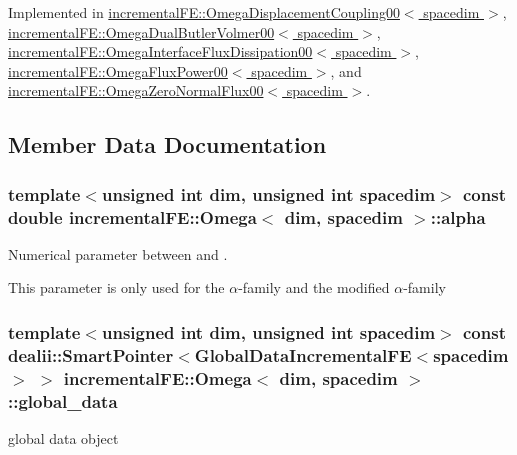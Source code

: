 Implemented in \hyperlink{classincremental_f_e_1_1_omega_displacement_coupling00_add2792deb962c321509264fce6fbdec5}{incremental\+F\+E\+::\+Omega\+Displacement\+Coupling00$<$ spacedim $>$}, \hyperlink{classincremental_f_e_1_1_omega_dual_butler_volmer00_ac3678f68c26fd880c2bd11fc357bc342}{incremental\+F\+E\+::\+Omega\+Dual\+Butler\+Volmer00$<$ spacedim $>$}, \hyperlink{classincremental_f_e_1_1_omega_interface_flux_dissipation00_a1d609a41db2f3231ad2f2d05aeea5441}{incremental\+F\+E\+::\+Omega\+Interface\+Flux\+Dissipation00$<$ spacedim $>$}, \hyperlink{classincremental_f_e_1_1_omega_flux_power00_abbcdc6c23167a34199401338b7fe058f}{incremental\+F\+E\+::\+Omega\+Flux\+Power00$<$ spacedim $>$}, and \hyperlink{classincremental_f_e_1_1_omega_zero_normal_flux00_a5e3158d47ccf7f0bf53dda6a93d27c57}{incremental\+F\+E\+::\+Omega\+Zero\+Normal\+Flux00$<$ spacedim $>$}.



\subsection{Member Data Documentation}
\subsubsection[{\texorpdfstring{alpha}{alpha}}]{\setlength{\rightskip}{0pt plus 5cm}template$<$unsigned int dim, unsigned int spacedim$>$ const double {\bf incremental\+F\+E\+::\+Omega}$<$ dim, spacedim $>$\+::alpha\hspace{0.3cm}{\ttfamily [private]}}\hypertarget{classincremental_f_e_1_1_omega_a891688560ec0ad8dc5a0058a7b400269}{}\label{classincremental_f_e_1_1_omega_a891688560ec0ad8dc5a0058a7b400269}
Numerical parameter between {} and {}.

This parameter is only used for the $\alpha$-\/family and the modified $\alpha$-\/family 
\subsubsection[{\texorpdfstring{global\+\_\+data}{global_data}}]{\setlength{\rightskip}{0pt plus 5cm}template$<$unsigned int dim, unsigned int spacedim$>$ const dealii\+::\+Smart\+Pointer$<${\bf Global\+Data\+Incremental\+FE}$<$spacedim$>$ $>$ {\bf incremental\+F\+E\+::\+Omega}$<$ dim, spacedim $>$\+::global\+\_\+data\hspace{0.3cm}{\ttfamily [private]}}\hypertarget{classincremental_f_e_1_1_omega_abd23d288a7a4a43f9b528be968cd2113}{}\label{classincremental_f_e_1_1_omega_abd23d288a7a4a43f9b528be968cd2113}
global data object 
